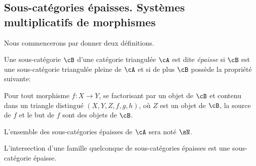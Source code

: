 \subsection{Sous-catégories épaisses. Systèmes multiplicatifs de morphismes}\label{VIII:2-1}

Nous commencerons par donner deux définitions. 





\begin{definition}\label{VIII:2-1-1}
Une sous-catégorie $\cB$ d'une catégorie triangulée $\cA$ est dite 
\emph{épaisse} si $\cB$ est une sous-catégorie triangulée pleine de $\cA$ 
et si de plus $\cB$ possède la propriété suivante: 

Pour tout morphisme $f:X\to Y$, se factorisant par un objet de $\cB$ et contenu 
dans un triangle distingué $(X,Y,Z,f,g,h)$, où $Z$ est un objet de $\cB$, 
la source de $f$ et le but de $f$ sont des objets de $\cB$. 
\end{definition}

L'ensemble des sous-catégories épaisses de $\cA$ sera noté $\sN$. 

L'intersection d'une famille quelconque de sous-catégories épaisses est 
une sous-catégorie épaisse. 






